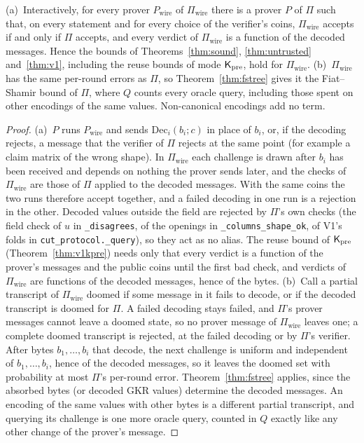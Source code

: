 \begin{theorem}
\label{thm:codec}
(a)~Interactively, for every prover $P_{\mathrm{wire}}$ of $\Pi_{\mathrm{wire}}$ there is a prover $P$
of $\Pi$ such that, on every statement and for every choice of the verifier's coins,
$\Pi_{\mathrm{wire}}$ accepts if and only if $\Pi$ accepts, and every verdict of
$\Pi_{\mathrm{wire}}$ is a function of the decoded messages. Hence the bounds of Theorems~\ref{thm:sound},
\ref{thm:untrusted} and~\ref{thm:v1}, including the reuse bounds of mode $\mathsf{K}_{\mathrm{pre}}$, hold for
$\Pi_{\mathrm{wire}}$.
(b)~$\Pi_{\mathrm{wire}}$ has the same per-round errors as $\Pi$, so Theorem~\ref{thm:fstree} gives
it the Fiat--Shamir bound of $\Pi$, where $Q$ counts every oracle query, including those spent on
other encodings of the same values. Non-canonical encodings add no term.
\end{theorem}

\begin{proof}
(a)~$P$ runs $P_{\mathrm{wire}}$ and sends $\mathrm{Dec}_i(b_i;c)$ in place of $b_i$, or, if the
decoding rejects, a message that the verifier of $\Pi$ rejects at the same point (for example a
claim matrix of the wrong shape). In $\Pi_{\mathrm{wire}}$ each challenge is drawn after $b_i$ has
been received and depends on nothing the prover sends later, and the checks of
$\Pi_{\mathrm{wire}}$ are those of $\Pi$ applied to the decoded messages. With the same coins the two
runs therefore accept together, and a failed decoding in one run is a rejection in the other.
Decoded values outside the field are rejected by
$\Pi$'s own checks (the field check of $u$ in \texttt{\_disagrees}, of the openings in
\texttt{\_columns\_shape\_ok}, of V1's folds in \texttt{cut\_protocol.\_query}), so they act as no
alias. The reuse bound of $\mathsf{K}_{\mathrm{pre}}$ (Theorem~\ref{thm:v1kpre}) needs only that every verdict is a
function of the prover's messages and the public coins until the first bad check, and verdicts of
$\Pi_{\mathrm{wire}}$ are functions of the decoded messages, hence of the bytes.
(b)~Call a partial transcript of $\Pi_{\mathrm{wire}}$ doomed if some message in it fails to decode,
or if the decoded transcript is doomed for $\Pi$. A failed decoding stays failed, and $\Pi$'s prover
messages cannot leave a doomed state, so no prover message of $\Pi_{\mathrm{wire}}$ leaves one; a
complete doomed transcript is rejected, at the failed decoding or by $\Pi$'s verifier. After bytes
$b_1,\dots,b_i$ that decode, the next challenge is uniform and independent of $b_1,\dots,b_i$, hence
of the decoded messages, so it leaves the doomed set with probability at most $\Pi$'s per-round
error. Theorem~\ref{thm:fstree} applies, since the absorbed bytes (or decoded GKR values) determine
the decoded messages. An encoding of the same values with other bytes is a different partial
transcript, and querying its challenge is one more oracle query, counted in $Q$ exactly like any
other change of the prover's message.
\end{proof}

